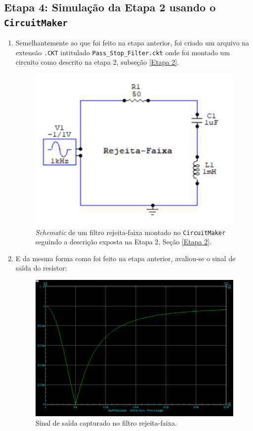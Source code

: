 \documentclass[letterpaper, 12pt]{article}
\begin{document}
\subsection{Etapa 4: Simulação da Etapa 2 usando o \texttt{CircuitMaker}}
\begin{enumerate}
    \item Semelhantemente ao que foi feito na etapa anterior, foi criado um arquivo na extensão \texttt{.CKT} intitulado \texttt{Pass\_Stop\_Filter.ckt} onde foi montado um circuito como descrito na etapa 2, subseção \ref{Etapa 2}.
    \begin{figure}[h]
        \centering
        \includegraphics[width=0.5\linewidth]{figures/Band_stop_schematic.png}
        \caption{{\it Schematic} de um filtro rejeita-faixa montado no \texttt{CircuitMaker} seguindo a descrição exposta na Etapa 2, Seção \ref{Etapa 2}.}
        \label{High_pass}
    \end{figure}
    
    \item E da mesma forma como foi feito na etapa anterior, avaliou-se o sinal de saída do resistor:
    \begin{figure}[h]
        \centering
        \includegraphics[width=0.5\linewidth]{figures/Band_stop_Graph.png}
        \caption{Sinal de saída capturado no filtro rejeita-faixa.}
        \label{fig:Band_stop}
    \end{figure}
\end{enumerate}

\newpage


\end{document}
